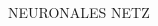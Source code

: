\begin{frame}[t]{NEURONALES NETZ}
\begin{columns}
\begin{column}{0.6\textwidth}
				\end{column}
		\end{columns}
\end{frame}
